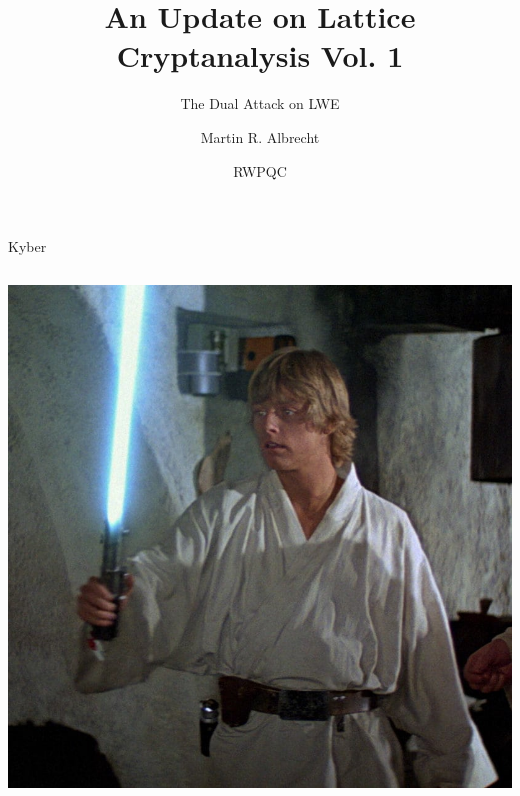 \documentclass[xcolor=table,10pt,aspectratio=169]{beamer}
\institute{King's College London \& SandboxAQ}
\author{Martin R. Albrecht}
\date{RWPQC}
\title{An Update on Lattice Cryptanalysis Vol. 1}
\subtitle{The Dual Attack on LWE}
\begin{document}
\maketitle



\begin{frame}[label={sec:orgef6af93}]{Kyber}
\begin{columns}[t]
\begin{column}{0.5\columnwidth}
\begin{center}
\includegraphics[keepaspectratio,height=.75\textheight]{./lightsaber.jpeg}
\end{center}
\end{column}


\end{columns}
\end{frame}
\end{document}
